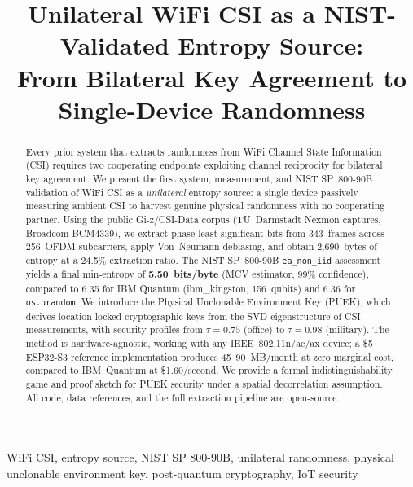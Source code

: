\documentclass[conference]{IEEEtran}
\begin{document}
\title{Unilateral WiFi CSI as a NIST-Validated Entropy Source: \\
From Bilateral Key Agreement to Single-Device Randomness}

\author{
}

\maketitle

\begin{abstract}
Every prior system that extracts randomness from WiFi Channel State Information (CSI) requires two cooperating endpoints exploiting channel reciprocity for bilateral key agreement.
We present the first system, measurement, and NIST SP~800-90B validation of WiFi CSI as a \emph{unilateral} entropy source: a single device passively measuring ambient CSI to harvest genuine physical randomness with no cooperating partner.
Using the public Gi-z/CSI-Data corpus (TU~Darmstadt Nexmon captures, Broadcom BCM4339), we extract phase least-significant bits from 343~frames across 256~OFDM subcarriers, apply Von~Neumann debiasing, and obtain 2,690~bytes of entropy at a 24.5\% extraction ratio.
The NIST SP~800-90B \texttt{ea\_non\_iid} assessment yields a final min-entropy of \textbf{5.50~bits/byte} (MCV estimator, 99\% confidence), compared to 6.35 for IBM Quantum (ibm\_kingston, 156~qubits) and 6.36 for \texttt{os.urandom}.
We introduce the Physical Unclonable Environment Key (PUEK), which derives location-locked cryptographic keys from the SVD eigenstructure of CSI measurements, with security profiles from $\tau=0.75$ (office) to $\tau=0.98$ (military).
The method is hardware-agnostic, working with any IEEE~802.11n/ac/ax device; a \$5 ESP32-S3 reference implementation produces 45--90~MB/month at zero marginal cost, compared to IBM~Quantum at \$1.60/second.
We provide a formal indistinguishability game and proof sketch for PUEK security under a spatial decorrelation assumption.
All code, data references, and the full extraction pipeline are open-source.
\end{abstract}

\begin{IEEEkeywords}
WiFi CSI, entropy source, NIST SP 800-90B, unilateral randomness, physical unclonable environment key, post-quantum cryptography, IoT security
\end{IEEEkeywords}
\end{document}
